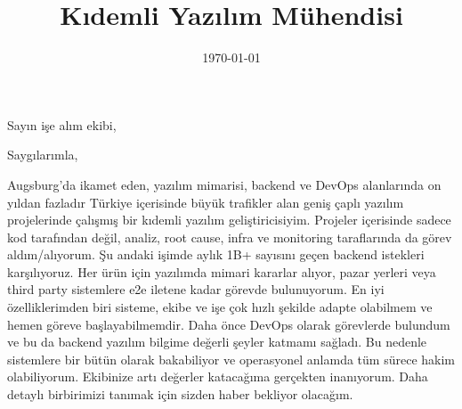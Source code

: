 \documentclass[11pt,a4paper,sans]{moderncv}
\title{K{\i}demli Yaz{\i}l{\i}m M\"uhendisi}
\begin{document}
\recipient{}{}
\date{\today}
\opening{Say{\i}n i\c{s}e al{\i}m ekibi,}
\closing{Sayg{\i}lar{\i}mla,}
\makelettertitle

Augsburg'da ikamet eden, yaz{\i}l{\i}m mimarisi, backend ve DevOps alanlar{\i}nda on y{\i}ldan fazlad{\i}r T\"urkiye i\c{c}erisinde b\"uy\"uk trafikler alan geni\c{s} \c{c}apl{\i} yaz{\i}l{\i}m projelerinde \c{c}al{\i}\c{s}m{\i}\c{s} bir k{\i}demli yaz{\i}l{\i}m geli\c{s}tiricisiyim. Projeler i\c{c}erisinde sadece kod taraf{\i}ndan de\u{g}il, analiz, root cause, infra ve monitoring taraflar{\i}nda da g\"orev ald{\i}m/al{\i}yorum. \c{S}u andaki i\c{s}imde ayl{\i}k 1B+ say{\i}s{\i}n{\i} ge\c{c}en backend istekleri kar\c{s}{\i}l{\i}yoruz. Her \"ur\"un i\c{c}in yaz{\i}l{\i}mda mimari kararlar al{\i}yor, pazar yerleri veya third party sistemlere e2e iletene kadar g\"orevde bulunuyorum. En iyi \"ozelliklerimden biri sisteme, ekibe ve i\c{s}e \c{c}ok h{\i}zl{\i} \c{s}ekilde adapte olabilmem ve hemen g\"oreve ba\c{s}layabilmemdir. Daha \"once DevOps olarak g\"orevlerde bulundum ve bu da backend yaz{\i}l{\i}m bilgime de\u{g}erli \c{s}eyler katmam{\i} sa\u{g}lad{\i}. Bu nedenle sistemlere bir b\"ut\"un olarak bakabiliyor ve operasyonel anlamda t\"um s\"urece hakim olabiliyorum. Ekibinize art{\i} de\u{g}erler kataca\u{g}{\i}ma ger\c{c}ekten inan{\i}yorum. Daha detayl{\i} birbirimizi tan{\i}mak i\c{c}in sizden haber bekliyor olaca\u{g}{\i}m.

\makeletterclosing
\end{document}
